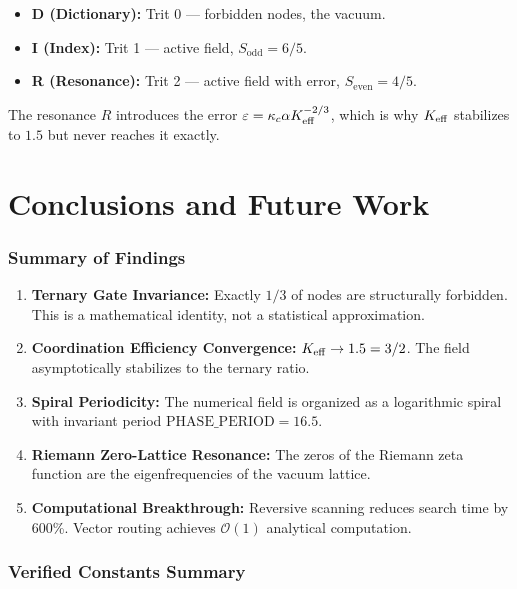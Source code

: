 \documentclass[12pt,a4paper]{article}
\newcommand{\PHASE}{\text{PHASE\_PERIOD}}
\begin{document}
	\begin{itemize}
		\item \textbf{D (Dictionary):} Trit 0 — forbidden nodes, the vacuum.
		\item \textbf{I (Index):} Trit 1 — active field, \(S_{\mathrm{odd}} = 6/5\).
		\item \textbf{R (Resonance):} Trit 2 — active field with error, \(S_{\mathrm{even}} = 4/5\).
	\end{itemize}
	
	The resonance \(R\) introduces the error \(\varepsilon = \kappa_c \alpha \Keff^{-2/3}\), which is why \(\Keff\) stabilizes to \(1.5\) but never reaches it exactly.
	
	\newpage
	
	\part{Conclusions and Future Work}
	
	\section{Summary of Findings}
	
	\begin{enumerate}
		\item \textbf{Ternary Gate Invariance:} Exactly \(1/3\) of nodes are structurally forbidden. This is a mathematical identity, not a statistical approximation.
		\item \textbf{Coordination Efficiency Convergence:} \(\Keff \to 1.5 = 3/2\). The field asymptotically stabilizes to the ternary ratio.
		\item \textbf{Spiral Periodicity:} The numerical field is organized as a logarithmic spiral with invariant period \(\PHASE = 16.5\).
		\item \textbf{Riemann Zero-Lattice Resonance:} The zeros of the Riemann zeta function are the eigenfrequencies of the vacuum lattice.
		\item \textbf{Computational Breakthrough:} Reversive scanning reduces search time by 600\%. Vector routing achieves \(\mathcal{O}(1)\) analytical computation.
	\end{enumerate}
	
	\section{Verified Constants Summary}
	
\end{document}
